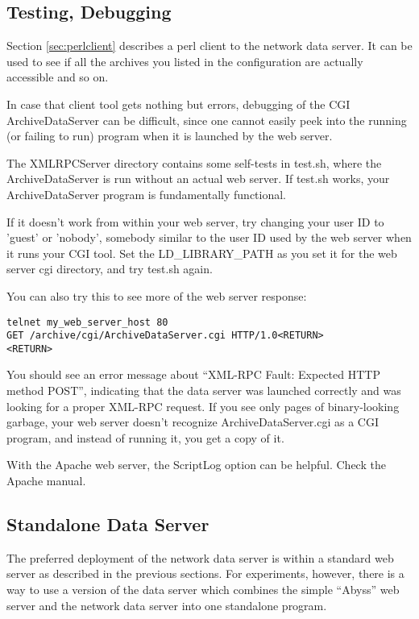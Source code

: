 


\subsection{Testing, Debugging}  %
Section \ref{sec:perlclient} describes a perl client to the network
data server. It can be used to see if all the archives you listed
in the configuration are actually accessible and so on.

In case that client tool gets nothing but errors, debugging of the
CGI ArchiveDataServer can be difficult, since one cannot easily
peek into the running (or failing to run) program when it is
launched by the web server.

The XMLRPCServer directory contains some self-tests in test.sh,
where the ArchiveDataServer is run without an actual web server.
If test.sh works, your ArchiveDataServer program is fundamentally
functional.

If it doesn't work from within your web server, try changing
your user ID to 'guest' or 'nobody', somebody similar to the user ID
used by the web server when it runs your CGI tool. Set the
LD\_LIBRARY\_PATH as you set it for the web server cgi directory,
and try test.sh again.

\noindent You can also try this to see more of the web server response:

\begin{lstlisting}[keywordstyle=\sffamily]
telnet my_web_server_host 80
GET /archive/cgi/ArchiveDataServer.cgi HTTP/1.0<RETURN>
<RETURN>
\end{lstlisting}

\noindent You should see an error message about ``XML-RPC Fault: Expected HTTP method POST'',
indicating that the data server was launched correctly and
was looking for a proper XML-RPC request.
If you see only pages of binary-looking garbage, your web server
doesn't recognize ArchiveDataServer.cgi as a CGI program,
and instead of running it, you get a copy of it.

With the Apache web server, the ScriptLog option can be helpful. Check
the Apache manual.

\subsection{Standalone Data Server} %
The preferred deployment of the network data server is within a
standard web server as described in the previous sections.
For experiments, however, there is a way to use a version of the 
data server which combines the simple ``Abyss''
web server and the network data server into one standalone program.

